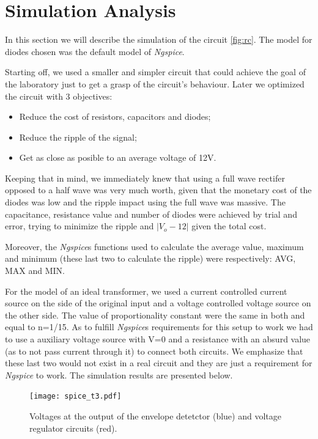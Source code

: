 \section{Simulation Analysis}
\label{sec:simulation}

In this section we will describe the simulation of the circuit \ref{fig:rc}.
The model for diodes chosen was the default model of \emph{Ngspice}.

Starting off, we used a smaller and simpler circuit that could achieve
the goal of the laboratory just to get a grasp of the circuit's behaviour.
Later we optimized the circuit with 3 objectives:
\begin{itemize}
  \item Reduce the cost of resistors, capacitors and diodes;
  \item Reduce the ripple of the signal;
  \item Get as close as posible to an average voltage of 12V.
\end{itemize}
Keeping that in mind, we immediately knew that using a full wave rectifer opposed to a half wave
was very much worth, given that the monetary cost of the diodes was low and the ripple impact using the full wave was massive.
The capacitance, resistance value and number of diodes were achieved by trial and error, trying to minimize the
ripple and $|V_{o}-12|$ given the total cost.

Moreover, the \emph{Ngspice}\textquotesingle s functions used to calculate the average value, maximum and minimum (these last two to calculate the ripple)
were respectively: AVG, MAX and MIN.

For the model of an ideal transformer, we used a current controlled current source on the side of the original input
and a voltage controlled voltage source on the other side.
The value of proportionality constant were the same in both and equal to n=1/15.
As to fulfill \emph{Ngspice}\textquotesingle s requirements for this setup to work we had to use a auxiliary voltage source with V=0
and a resistance with an absurd value (as to not pass current through it) to connect both circuits. We
emphasize that these last two would not exist in a real circuit and they are just a requirement for \emph{Ngspice} to work. The simulation results are
presented below.

\begin{figure}[h] \centering
  \texttt{[image: spice\_t3.pdf]}
  \caption{Voltages at the output of the envelope detetctor (blue) and voltage regulator circuits (red).}
  \label{fig:11}
\end{figure}

